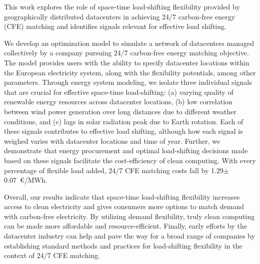 %

This work explores the role of space-time load-shifting flexibility provided by geographically distributed datacenters in achieving 24/7 carbon-free energy (CFE) matching and identifies signals relevant for effective load shifting.

We develop an optimization model to simulate a network of datacenters managed collectively by a company pursuing 24/7 carbon-free energy matching objective.
The model provides users with the ability to specify datacenter locations within the European electricity system, along with the flexibility potentials, among other parameters.
Through energy system modeling, we isolate three individual signals that are crucial for effective space-time load-shifting: (a) varying quality of renewable energy resources across datacenter locations, (b) low correlation between wind power generation over long distances due to different weather conditions, and (c) lags in solar radiation peak due to Earth rotation. Each of these signals contributes to effective load shifting, although how each signal is weighed varies with datacenter locations and time of year.
Further, we demonstrate that energy procurement and optimal load-shifting decisions made based on these signals facilitate the cost-efficiency of clean computing. With every percentage of flexible load added, 24/7 CFE matching costs fall by 1.29$\pm$0.07~\euro/MWh.

Overall, our results indicate that space-time load-shifting flexibility increases access to clean electricity and gives consumers more options to match demand with carbon-free electricity.
By utilizing demand flexibility, truly clean computing can be made more affordable and resource-efficient.
Finally, early efforts by the datacenter industry can help and pave the way for a broad range of companies by establishing standard methods and practices for load-shifting flexibility in the context of 24/7 CFE matching.